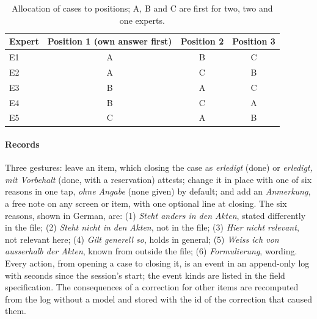\begin{table}[h]
\caption{Allocation of cases to positions; A, B and C are first for two, two and one experts.}
\label{tab:protocol-allocation}
\footnotesize
\begin{tabular}{@{}lccc@{}}
\toprule
Expert & Position 1 (own answer first) & Position 2 & Position 3 \\
\midrule
E1 & A & B & C \\
E2 & A & C & B \\
E3 & B & A & C \\
E4 & B & C & A \\
E5 & C & A & B \\
\bottomrule
\end{tabular}
\end{table}

\paragraph{Records}
Three gestures: leave an item, which closing the case as \emph{erledigt} (done) or \emph{erledigt, mit Vorbehalt} (done, with a reservation) attests; change it in place with one of six reasons in one tap, \emph{ohne Angabe} (none given) by default; and add an \emph{Anmerkung}, a free note on any screen or item, with one optional line at closing. The six reasons, shown in German, are: (1) \emph{Steht anders in den Akten}, stated differently in the file; (2) \emph{Steht nicht in den Akten}, not in the file; (3) \emph{Hier nicht relevant}, not relevant here; (4) \emph{Gilt generell so}, holds in general; (5) \emph{Weiss ich von ausserhalb der Akten}, known from outside the file; (6) \emph{Formulierung}, wording. Every action, from opening a case to closing it, is an event in an append-only log with seconds since the session's start; the event kinds are listed in the field specification. The consequences of a correction for other items are recomputed from the log without a model and stored with the id of the correction that caused them.


